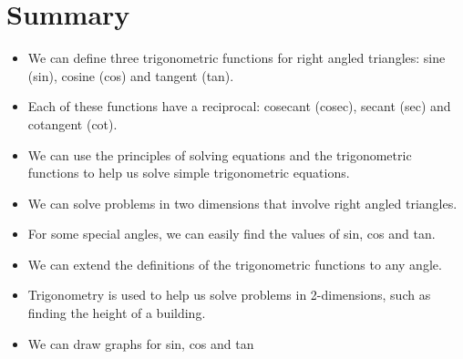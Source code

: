             \section{ Summary}
            \nopagebreak
            \label{m39414*eip-197}\begin{itemize}[noitemsep]
            \item We can define three trigonometric functions for right angled triangles: sine (sin), cosine (cos) and tangent (tan).\item Each of these functions have a reciprocal: cosecant (cosec), secant (sec) and cotangent (cot).
\item We can use the principles of solving equations and the trigonometric functions to help us solve simple trigonometric equations.\item We can solve problems in two dimensions that involve right angled triangles.\item For some special angles, we can easily find the values of sin, cos and tan.\item We can extend the definitions of the trigonometric functions to any angle.\item 
Trigonometry is used to help us solve problems in 2-dimensions, such as finding the height of a building.\item 
We can draw graphs for sin, cos and tan\end{itemize}
        \label{m39414*cid8}
